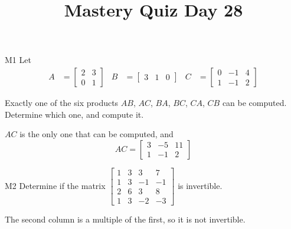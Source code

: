 \documentclass{sbgLAquiz}
\title{Mastery Quiz Day 28 }
\begin{document}
\begin{problem}{M1}
Let 
\begin{align*}
A &= \begin{bmatrix} 2 & 3 \\ 0 & 1 \end{bmatrix} & B&= \begin{bmatrix} 3 & 1 & 0 \end{bmatrix} & C&= \begin{bmatrix} 0 & -1 & 4 \\ 1 & -1 & 2 \end{bmatrix}
\end{align*}

Exactly one of the six products $AB$, $AC$, $BA$, $BC$, $CA$, $CB$ can be computed.  Determine which one, and compute it.
\end{problem}
\begin{solution}
$AC$ is the only one that can be computed, and 
$$AC = \begin{bmatrix} 3 & -5 & 11 \\ 1 & -1 & 2 \end{bmatrix}$$
\end{solution}

\begin{problem}{M2}
Determine if the matrix $\begin{bmatrix} 1 & 3 & 3 & 7 \\ 1 & 3 & -1 & -1 \\ 2 & 6 & 3 & 8 \\ 1 & 3 & -2 & -3 \end{bmatrix}$ is invertible.
\end{problem}
\begin{solution}
The second column is a multiple of the first, so it is not invertible.
\end{solution}
\end{document}
